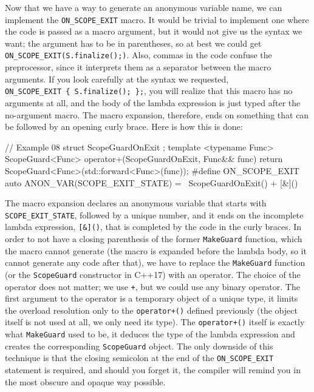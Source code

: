 Now that we have a way to generate an anonymous variable name, we can implement the \texttt{ON\_SCOPE\_EXIT} macro. It would be trivial to implement one where the code is passed as a macro argument, but it would not give us the syntax we want; the argument has to be in parentheses, so at best we could get \texttt{ON\_SCOPE\_EXIT(S.finalize();)}. Also, commas in the code confuse the preprocessor, since it interprets them as a separator between the macro arguments. If you look carefully at the syntax we requested, \texttt{ON\_SCOPE\_EXIT\ \{\ S.finalize();\ \};}, you will realize that this macro has no arguments at all, and the body of the lambda expression is just typed after the no-argument macro. The macro expansion, therefore, ends on something that can be followed by an opening curly brace. Here is how this is done:

\begin{code}
// Example 08
struct ScopeGuardOnExit {};
template <typename Func>
ScopeGuard<Func> operator+(ScopeGuardOnExit, Func&& func) {
  return ScopeGuard<Func>(std::forward<Func>(func));
}
#define ON_SCOPE_EXIT auto ANON_VAR(SCOPE_EXIT_STATE) = \
  ScopeGuardOnExit() + [&]()
\end{code}

The macro expansion declares an anonymous variable that starts with \texttt{SCOPE\_EXIT\_STATE}, followed by a unique number, and it ends on the incomplete lambda expression, \texttt{{[}\&{]}()}, that is completed by the code in the curly braces. In order to not have a closing parenthesis of the former \texttt{MakeGuard} function, which the macro cannot generate (the macro is expanded before the lambda body, so it cannot generate any code after that), we have to replace the \texttt{MakeGuard} function (or the \texttt{ScopeGuard} constructor in C++17) with an operator. The choice of the operator does not matter; we use \texttt{+}, but we could use any binary operator. The first argument to the operator is a temporary object of a unique type, it limits the overload resolution only to the \texttt{operator+()} defined previously (the object itself is not used at all, we only need its type). The \texttt{operator+()} itself is exactly what \texttt{MakeGuard} used to be, it deduces the type of the lambda expression and creates the corresponding \texttt{ScopeGuard} object. The only downside of this technique is that the closing semicolon at the end of the \texttt{ON\_SCOPE\_EXIT} statement is required, and should you forget it, the compiler will remind you in the most obscure and opaque way possible.

